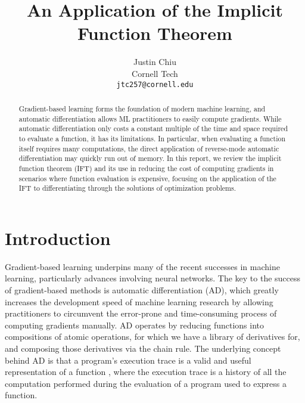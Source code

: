 \documentclass[11pt]{article}
\title{An Application of the Implicit Function Theorem}
\author{Justin Chiu \\
  Cornell Tech \\
  \texttt{jtc257@cornell.edu}}
\begin{document}
\maketitle
\begin{abstract}
Gradient-based learning forms the foundation of modern machine learning,
and automatic differentiation allows ML practitioners to easily compute gradients.
While automatic differentiation only costs a constant multiple of the time and space
required to evaluate a function, it has its limitations.
In particular, when evaluating a function itself requires many computations,
the direct application of reverse-mode
automatic differentiation may quickly run out of memory.
In this report, we review the implicit function theorem (IFT)
and its use in reducing the cost of computing gradients in scenarios where
function evaluation is expensive,
focusing on the application of the IFT to differentiating
through the solutions of optimization problems.
\end{abstract}

\section{Introduction}
\label{sec:intro}
Gradient-based learning underpins many of the recent successes in machine learning,
particularly advances involving neural networks.
The key to the success of gradient-based methods is automatic differentiation (AD),
which greatly increases the development speed of machine learning research by
allowing practitioners to circumvent the error-prone and time-consuming process
of computing gradients manually.
AD operates by reducing functions into compositions of atomic operations,
for which we have a library of derivatives for,
and composing those derivatives via the chain rule.
The underlying concept behind AD is that a program's execution trace is a valid
and useful representation of a function \citep{griewank2008autodiff},
where the execution trace is a history of all the computation performed
during the evaluation of a program used to express a function.
\end{document}
